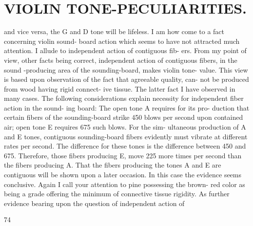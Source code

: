 \documentclass{article}
\begin{document}
\section*{VIOLIN TONE-PECULIARITIES.}
and vice versa, the G and D tone will be lifeless. I am how come to a fact concerning violin sound- board action which seems to have not attracted much attention. I allude to independent action of contiguous fib- ers. From my point of view, other facts being correct, independent action of contiguous fibers, in the sound -producing area of the sounding-board, makes violin tone- value. This view is based upon observation of the fact that agreeable quality, can- not be produced from wood having rigid connect- ive tissue. The latter fact I have observed in many cases. The following considerations explain necessity for independent fiber action in the sound- ing board: The open tone A requires for its pro- duction that certain fibers of the sounding-board strike 450 blows per second upon contained air; open tone E requires 675 such blows. For the sim- ultaneous production of A and E tones, contiguous sounding-board fibers evidently must vibrate at different rates per second. The difference for these tones is the difference between 450 and 675. Therefore, those fibers producing E, move 225 more times per second than the fibers producing A. That the fibers producing the tones A and E are contiguous will be shown upon a later occasion. In this case the evidence seems conclusive. Again I call your attention to pine possessing the brown- red color as being a grade offering the minimum of connective tissue rigidity. As further evidence bearing upon the question of independent action of

74
\end{document}
